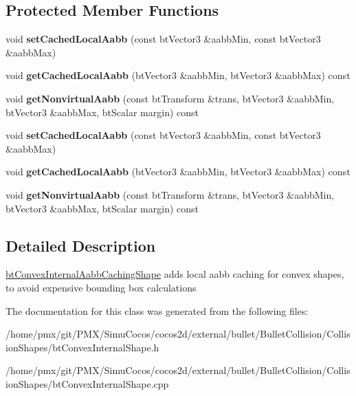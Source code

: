 \subsection*{Protected Member Functions}
\begin{DoxyCompactItemize}
\item 
\mbox{\label{classbtConvexInternalAabbCachingShape_abb8fcb1198a4698d7d16b2ddfad640ee}} 
void {\bfseries set\+Cached\+Local\+Aabb} (const bt\+Vector3 \&aabb\+Min, const bt\+Vector3 \&aabb\+Max)
\item 
\mbox{\label{classbtConvexInternalAabbCachingShape_a0b1e6522cd6ea040251bcaf97b801af8}} 
void {\bfseries get\+Cached\+Local\+Aabb} (bt\+Vector3 \&aabb\+Min, bt\+Vector3 \&aabb\+Max) const
\item 
\mbox{\label{classbtConvexInternalAabbCachingShape_a0aa92263a2f61a177ac326ec7c6ef243}} 
void {\bfseries get\+Nonvirtual\+Aabb} (const bt\+Transform \&trans, bt\+Vector3 \&aabb\+Min, bt\+Vector3 \&aabb\+Max, bt\+Scalar margin) const
\item 
\mbox{\label{classbtConvexInternalAabbCachingShape_abb8fcb1198a4698d7d16b2ddfad640ee}} 
void {\bfseries set\+Cached\+Local\+Aabb} (const bt\+Vector3 \&aabb\+Min, const bt\+Vector3 \&aabb\+Max)
\item 
\mbox{\label{classbtConvexInternalAabbCachingShape_a0b1e6522cd6ea040251bcaf97b801af8}} 
void {\bfseries get\+Cached\+Local\+Aabb} (bt\+Vector3 \&aabb\+Min, bt\+Vector3 \&aabb\+Max) const
\item 
\mbox{\label{classbtConvexInternalAabbCachingShape_a0aa92263a2f61a177ac326ec7c6ef243}} 
void {\bfseries get\+Nonvirtual\+Aabb} (const bt\+Transform \&trans, bt\+Vector3 \&aabb\+Min, bt\+Vector3 \&aabb\+Max, bt\+Scalar margin) const
\end{DoxyCompactItemize}


\subsection{Detailed Description}
\hyperlink{classbtConvexInternalAabbCachingShape}{bt\+Convex\+Internal\+Aabb\+Caching\+Shape} adds local aabb caching for convex shapes, to avoid expensive bounding box calculations 

The documentation for this class was generated from the following files\+:\begin{DoxyCompactItemize}
\item 
/home/pmx/git/\+P\+M\+X/\+Simu\+Cocos/cocos2d/external/bullet/\+Bullet\+Collision/\+Collision\+Shapes/bt\+Convex\+Internal\+Shape.\+h\item 
/home/pmx/git/\+P\+M\+X/\+Simu\+Cocos/cocos2d/external/bullet/\+Bullet\+Collision/\+Collision\+Shapes/bt\+Convex\+Internal\+Shape.\+cpp\end{DoxyCompactItemize}
